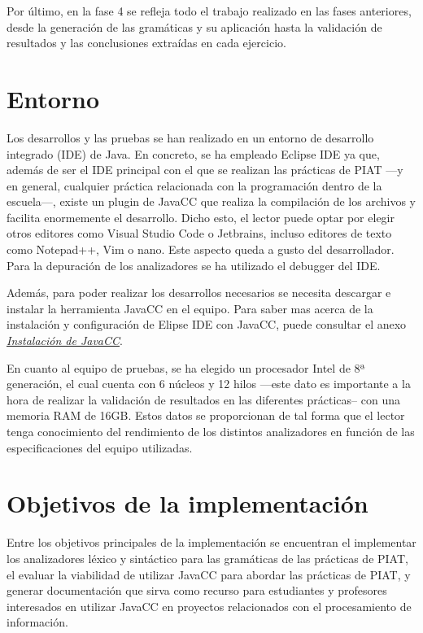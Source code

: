 \noindent Por último, en la fase 4 se refleja todo el trabajo realizado en las fases anteriores, desde la generación de las gramáticas y su aplicación hasta la validación de resultados y las conclusiones extraídas en cada ejercicio.


\section{Entorno}
\noindent Los desarrollos y las pruebas se han realizado en un entorno de desarrollo integrado (IDE) de Java. En concreto, se ha empleado Eclipse IDE ya que, además de ser el IDE principal con el que se realizan las prácticas de PIAT ---y en general, cualquier práctica relacionada con la programación dentro de la escuela---, existe un plugin de JavaCC que realiza la compilación de los archivos y facilita enormemente el desarrollo. Dicho esto, el lector puede optar por elegir otros editores como Visual Studio Code o Jetbrains, incluso editores de texto como Notepad++, Vim o  nano. Este aspecto queda a gusto del desarrollador. Para la depuración de los analizadores se ha utilizado el debugger del IDE.

Además, para poder realizar los desarrollos necesarios se necesita descargar e instalar la herramienta JavaCC en el equipo. Para saber mas acerca de la instalación y configuración de Elipse IDE con JavaCC, puede consultar el anexo \hyperref[sec:instalaciondejavacc]{\textit{Instalación de JavaCC}}.

En cuanto al equipo de pruebas, se ha elegido un procesador Intel de 8ª generación, el cual cuenta con 6 núcleos y 12 hilos ---este dato es importante a la hora de realizar la validación de resultados en las diferentes prácticas-- con una memoria RAM de 16GB. Estos datos se proporcionan de tal forma que el lector tenga conocimiento del rendimiento de los distintos analizadores en función de  las especificaciones del equipo utilizadas.

\section{Objetivos de la implementación}
\noindent Entre los objetivos principales de la implementación se encuentran el implementar los analizadores léxico y sintáctico para las gramáticas de las prácticas de PIAT, el evaluar la viabilidad de utilizar JavaCC para abordar las prácticas de PIAT, y generar documentación que sirva como recurso para estudiantes y profesores interesados en utilizar JavaCC en proyectos relacionados con el procesamiento de información.

